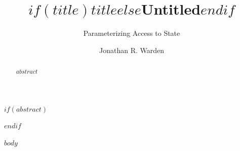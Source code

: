 \documentclass[english,submission]{programming}
\title{$if(title)$$title$$else$Untitled$endif$}
\subtitle{Parameterizing Access to State}
\author{Jonathan R. Warden}
\affiliation{Social Protocols}
\begin{document}
\maketitle

$if(abstract)$
\begin{abstract}
\sloppy
$abstract$
\end{abstract}
$endif$

$body$
\end{document}
